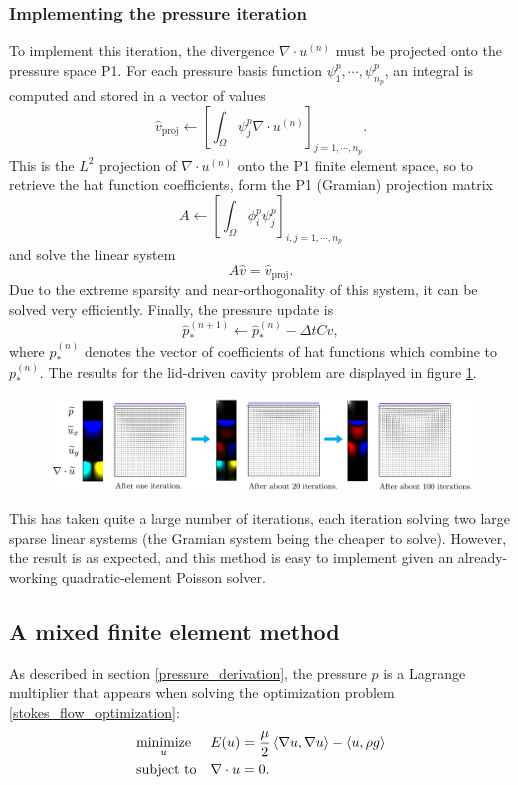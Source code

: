 \subsubsection{Implementing the pressure iteration}
To implement this iteration, the divergence $\nabla\cdot u^{(n)}$ must be projected onto the pressure space P1.
For each pressure basis function $\psi^p_1,\cdots,\psi^p_{n_p}$, an integral is computed and stored in a vector of values
$$
    \hat{v}_{\text{proj}} \leftarrow \left[\int_\Omega \psi^p_j \nabla\cdot u^{(n)}\right]_{j=1,\cdots,n_p}.
$$
This is the $L^2$ projection of $\nabla\cdot u^{(n)}$ onto the P1 finite element space, so to retrieve the hat function coefficients,
form the P1 (Gramian) projection matrix
$$
    A \leftarrow \left[ \int_\Omega \phi^p_i\psi^p_j \right]_{i,j=1,\cdots,n_p}
$$
and solve the linear system
$$
    A\hat{v} = \hat{v}_{\text{proj}}.
$$
Due to the extreme sparsity and near-orthogonality of this system, it can be solved very efficiently. Finally,
the pressure update is
$$
    \hat{p}_*^{(n+1)} \leftarrow \hat{p}_*^{(n)} - \Delta t C \hat{v},
$$
where $\hat{p}_*^{(n)}$ denotes the vector of coefficients of hat functions which combine to $p_*^{(n)}$.
The results for the lid-driven cavity problem are displayed in figure \ref{stokes_lid_driven_weakly_incomprssible}.

\begin{figure}[H]
    \centering
    \centerline{\includegraphics[width=1.3\textwidth]{figures/stokes/lid_driven_weakly_incompressible/figure.png}}
    \label{stokes_lid_driven_weakly_incomprssible}
\end{figure}
This has taken quite a large number of iterations, each iteration solving two large sparse linear systems (the Gramian system being the cheaper to solve).
However, the result is as expected, and this method is easy to implement given an already-working quadratic-element Poisson solver.

\subsection{A mixed finite element method}

As described in section \ref{pressure_derivation}, the pressure $p$ is a Lagrange multiplier that appears
when solving the optimization problem \eqref{stokes_flow_optimization}:
\begin{equation*}
\begin{aligned}
& \underset{u}{\text{minimize}}
& & E(u) =  \frac{\mu}{2} \left<\nabla u, \nabla u\right> - \left<u, \rho g\right>\\
& \text{subject to}
& & \nabla\cdot u = 0.
\end{aligned}
\end{equation*}

